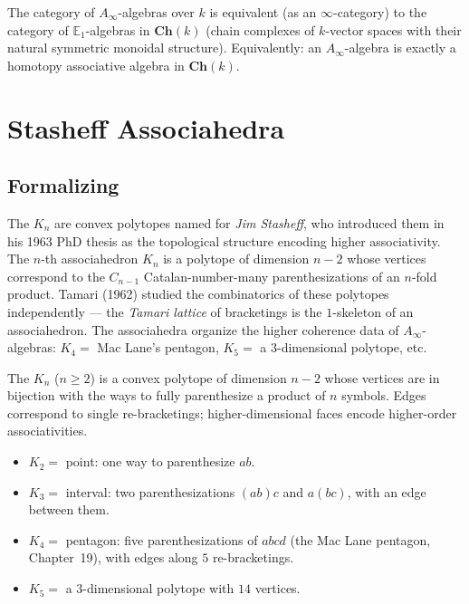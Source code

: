 \begin{theorem}[$A_\infty = \mathbb{E}_1$ in chain complexes]
\label{thm:Ainf-E1}
The category of $A_\infty$-algebras over $k$ is equivalent (as an
$\infty$-category) to the category of $\mathbb{E}_1$-algebras in
$\mathbf{Ch}(k)$ (chain complexes of $k$-vector spaces with their
natural symmetric monoidal structure). Equivalently: an $A_\infty$-algebra
is exactly a homotopy associative algebra in $\mathbf{Ch}(k)$.
\end{theorem}


\section{Stasheff Associahedra}
\label{sec:associahedra}

\subsection{Formalizing}

\begin{nameorigin}
The  $K_n$ are convex polytopes named for
\emph{Jim Stasheff}, who introduced them in his 1963 PhD thesis as
the topological structure encoding higher associativity. The $n$-th
associahedron $K_n$ is a polytope of dimension $n - 2$ whose vertices
correspond to the $C_{n-1}$ Catalan-number-many parenthesizations of an
$n$-fold product. Tamari (1962) studied the combinatorics of these
polytopes independently — the \emph{Tamari lattice} of bracketings is
the $1$-skeleton of an associahedron. The associahedra organize the
higher coherence data of $A_\infty$-algebras: $K_4 = $ Mac Lane's
pentagon, $K_5 = $ a $3$-dimensional polytope, etc.
\end{nameorigin}

\begin{definition}[Associahedron $K_n$]
\label{def:associahedron}
The  $K_n$ ($n \geq 2$) is a convex
polytope of dimension $n - 2$ whose vertices are in bijection with the
ways to fully parenthesize a product of $n$ symbols. Edges correspond to
single re-bracketings; higher-dimensional faces encode higher-order
associativities.
\end{definition}

\begin{example_thm}
\label{ex:associahedra-low}
\begin{itemize}
  \item $K_2 = $ point: one way to parenthesize $ab$.
  \item $K_3 = $ interval: two parenthesizations $(ab)c$ and $a(bc)$,
        with an edge between them.
  \item $K_4 = $ pentagon: five parenthesizations of $abcd$
        (the Mac Lane pentagon, Chapter~19), with edges along
        $5$ re-bracketings.
  \item $K_5 = $ a $3$-dimensional polytope with $14$ vertices.
\end{itemize}
\end{example_thm}

